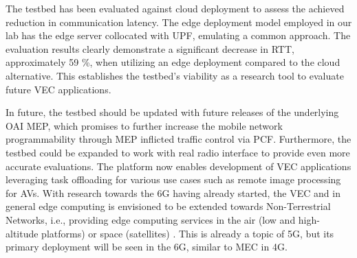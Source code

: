 \documentclass[12pt,a4paper,twoside]{report}
\begin{document}
The testbed has been evaluated against cloud deployment to assess the achieved reduction in communication latency. The edge deployment model employed in our lab has the edge server collocated with UPF, emulating a common approach. The evaluation results clearly demonstrate a significant decrease in RTT, approximately 59 \%, when utilizing an edge deployment compared to the cloud alternative. This establishes the testbed’s viability as a research tool to evaluate future VEC applications. 

In future, the testbed should be updated with future releases of the underlying OAI MEP, which promises to further increase the mobile network programmability through MEP inflicted traffic control via PCF. Furthermore, the testbed could be expanded to work with real radio interface to provide even more accurate evaluations. The platform now enables development of VEC applications leveraging task offloading for various use cases such as remote image processing for AVs. With research towards the 6G having already started, the VEC and in general edge computing is envisioned to be extended towards Non-Terrestrial Networks, i.e., providing edge computing services in the air (low and high-altitude platforms) or space (satellites) \cite{araniti2021toward6G}. This is already a topic of 5G, but its primary deployment will be seen in the 6G, similar to MEC in 4G.





\clearpage

%

%
%
	
	
\end{document}
